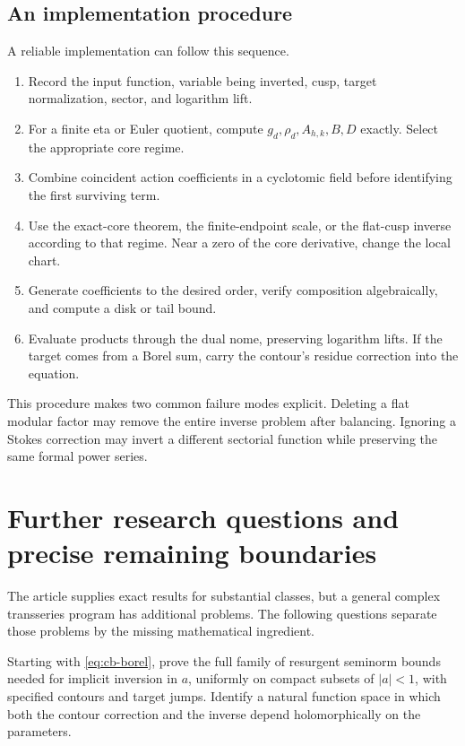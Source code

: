 \subsection{An implementation procedure}

A reliable implementation can follow this sequence.
\begin{enumerate}[leftmargin=*,itemsep=3pt]
\item Record the input function, variable being inverted, cusp,
      target normalization, sector, and logarithm lift.
\item For a finite eta or Euler quotient, compute
      \(g_d,\rho_d,A_{h,k},B,D\) exactly.
      Select the appropriate core regime.
\item Combine coincident action coefficients in a cyclotomic
      field before identifying the first surviving term.
\item Use the exact-core theorem, the finite-endpoint scale,
      or the flat-cusp inverse according to that regime.
      Near a zero of the core derivative, change the local chart.
\item Generate coefficients to the desired order, verify
      composition algebraically, and compute a disk or tail bound.
\item Evaluate products through the dual nome, preserving
      logarithm lifts.  If the target comes from a Borel sum,
      carry the contour's residue correction into the equation.
\end{enumerate}

This procedure makes two common failure modes explicit.
Deleting a flat modular factor may remove the entire inverse
problem after balancing.  Ignoring a Stokes correction may
invert a different sectorial function while preserving the same
formal power series.

\section{Further research questions and precise remaining boundaries}
\label{sec:future}

The article supplies exact results for substantial classes, but a
general complex transseries program has additional problems.
The following questions separate those problems by the missing
mathematical ingredient.

\begin{question}
Starting with \cref{eq:cb-borel}, prove the full family of
resurgent seminorm bounds needed for implicit inversion in
\(a\), uniformly on compact subsets of \(|a|<1\), with specified
contours and target jumps.  Identify a natural function space in
which both the contour correction and the inverse depend
holomorphically on the parameters.
\end{question}

